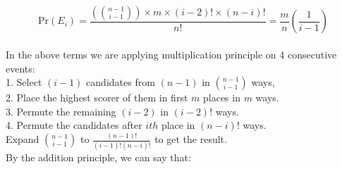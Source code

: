 \documentclass[12pt]{article}
\begin{document}
\[
\text{Pr}(E_i) = \frac{\left(\binom{n-1}{i-1}\right) \times m \times (i-2)! \times (n-i)! }{n!} = \frac{m}{n} \left(\frac{1}{i-1}\right)
\]
\\
In the above terms we are applying multiplication principle on 4 consecutive events: \\
1. Select $(i-1)$ candidates from $(n-1)$ in $\binom{n-1}{i-1}$ ways,\\
2. Place the highest scorer of them in first $m$ places in $m$ ways.\\
3. Permute the remaining $(i-2)$ in $(i-2)!$ ways.\\
4. Permute the candidates after $ith$ place in $(n-i)!$ ways. \\
Expand $\binom{n-1}{i-1}$ to $\frac{(n-1)!}{(i-1)!(n-i)!}$ to get the result.
\\
By the addition principle, we can say that:
\end{document}
